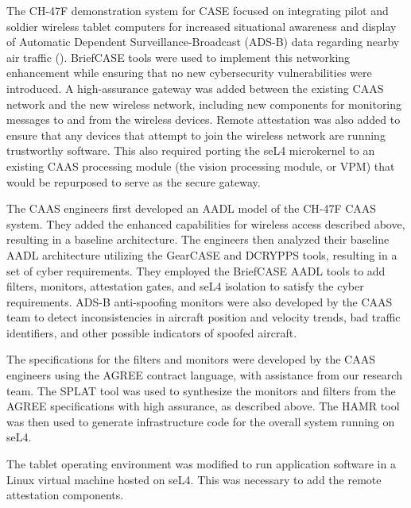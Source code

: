 The CH-47F demonstration system
for CASE focused on integrating pilot and soldier wireless tablet computers for
increased situational awareness and display of Automatic Dependent Surveillance-Broadcast (ADS-B)
data regarding nearby air traffic ().  
BriefCASE tools were used to implement this networking enhancement while ensuring that no new cybersecurity
vulnerabilities were introduced.  A high-assurance gateway was added between the existing CAAS 
network and the new wireless network, including new components for monitoring messages to and from the wireless 
devices.  Remote attestation was also added to ensure that any devices that attempt to join the wireless network
are running trustworthy software.   
This also required porting the seL4 microkernel to an existing CAAS
processing module (the vision processing module, or VPM) that would be repurposed to serve as the secure gateway.  


The CAAS engineers first developed an AADL model of the CH-47F CAAS system. They added the
enhanced capabilities for wireless access described above, resulting in a baseline architecture. The 
engineers then analyzed their baseline AADL architecture utilizing the GearCASE and DCRYPPS tools,
resulting in a set of cyber requirements. They employed the BriefCASE AADL tools to add
filters, monitors, attestation gates, and seL4 isolation to satisfy the cyber
requirements. ADS-B anti-spoofing monitors were also developed by the CAAS team to 
detect inconsistencies in aircraft position and velocity trends,
bad traffic identifiers, and other possible indicators of spoofed aircraft.

The specifications for the filters and monitors were developed by the CAAS engineers
using the AGREE contract language, with assistance from our research team.  The SPLAT tool was
used to synthesize the monitors and filters from the AGREE specifications
with high assurance, as described above. The HAMR tool was then used
to generate infrastructure code for the overall system running on seL4.

The tablet operating environment was modified to run application software in a Linux virtual machine
hosted on seL4.  This was necessary to add the remote attestation components.  

